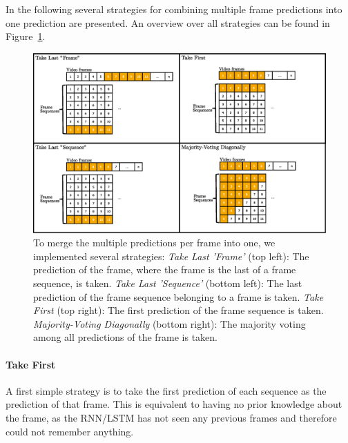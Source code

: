 In the following several strategies for combining multiple frame predictions into one prediction are presented.
An overview over all strategies can be found in Figure~\ref{fig:merging_strategies}.
\begin{figure}[!htb]
	\centering
	\includegraphics[scale=.5]{images/merging_strategies.eps}
	\caption{To merge the multiple predictions per frame into one, we implemented several strategies:
    \textit{Take Last 'Frame'} (top left): The prediction of the frame, where the frame is the last of a frame sequence, is taken.
    \textit{Take Last 'Sequence'} (bottom left): The last prediction of the frame sequence belonging to a frame is taken.
    \textit{Take First} (top right): The first prediction of the frame sequence is taken.
    \textit{Majority-Voting Diagonally} (bottom right): The majority voting among all predictions of the frame is taken.}
	\label{fig:merging_strategies}
\end{figure}
\paragraph{Take First}
A first simple strategy is to take the first prediction of each sequence as the prediction of that frame.
This is equivalent to having no prior knowledge about the frame, as the RNN/LSTM has not seen any previous frames and therefore could not remember anything.


